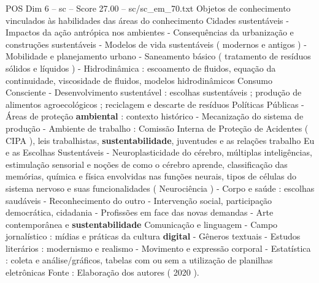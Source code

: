 \begin{textsample}{POS Dim 6 – sc – Score 27.00 – sc/sc\_em\_70.txt}
Objetos de conhecimento vinculados às habilidades das áreas do conhecimento Cidades sustentáveis - Impactos da ação antrópica nos ambientes - Consequências da urbanização e construções sustentáveis - Modelos de vida sustentáveis ( modernos e antigos ) - Mobilidade e planejamento urbano - Saneamento básico ( tratamento de resíduos sólidos e líquidos ) - Hidrodinâmica : escoamento de fluidos, equação da continuidade, viscosidade de fluidos, modelos hidrodinâmicos Consumo Consciente - Desenvolvimento sustentável : escolhas sustentáveis ; produção de alimentos agroecológicos ; reciclagem e descarte de resíduos Políticas Públicas - Áreas de proteção \textbf{ambiental} : contexto histórico - Mecanização do sistema de produção - Ambiente de trabalho : Comissão Interna de Proteção de Acidentes ( CIPA ), leis trabalhistas, \textbf{sustentabilidade}, juventudes e as relações trabalho Eu e as Escolhas Sustentáveis - Neuroplasticidade do cérebro, múltiplas inteligências, estimulação sensorial e noções de como o cérebro aprende, classificação das memórias, química e física envolvidas nas funções neurais, tipos de células do sistema nervoso e suas funcionalidades ( Neurociência ) - Corpo e saúde : escolhas saudáveis - Reconhecimento do outro - Intervenção social, participação democrática, cidadania - Profissões em face das novas demandas - Arte contemporânea e \textbf{sustentabilidade} Comunicação e linguagem - Campo jornalístico : mídias e práticas da cultura \textbf{digital} - Gêneros textuais - Estudos literários : modernismo e realismo - Movimento e expressão corporal - Estatística : coleta e análise/gráficos, tabelas com ou sem a utilização de planilhas eletrônicas Fonte : Elaboração dos autores ( 2020 ).

\end{textsample}
